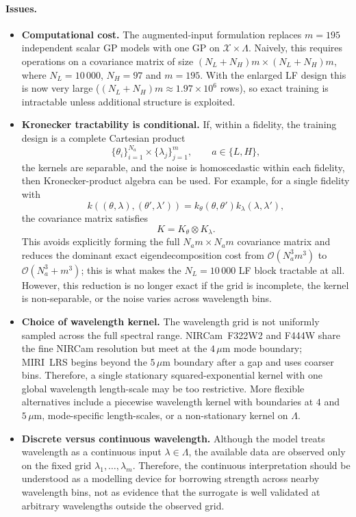 \documentclass[11pt,a4paper]{article}
\begin{document}
\paragraph{Issues.}
\begin{itemize}
    \item \textbf{Computational cost.}
    The augmented-input formulation replaces \(m=195\) independent scalar
    GP models with one GP on \(\mathcal X\times\Lambda\). Naively, this
    requires operations on a covariance matrix of size
    \((N_L+N_H)m\times(N_L+N_H)m\), where \(N_L=10\,000\), \(N_H=97\) and
    \(m=195\). With the enlarged LF design this is now very large
    (\((N_L+N_H)m\approx 1.97\times10^{6}\) rows), so exact training is
    intractable unless additional structure is exploited.

    \item \textbf{Kronecker tractability is conditional.}
    If, within a fidelity, the training design is a complete Cartesian product
    \[
        \{\theta_i\}_{i=1}^{N_a} \times \{\lambda_j\}_{j=1}^m,
        \qquad a\in\{L,H\},
    \]
    the kernels are separable, and the noise is homoscedastic within each
    fidelity, then Kronecker-product algebra can be used. For example, for
    a single fidelity with
    \[
        k((\theta,\lambda),(\theta',\lambda'))
        =
        k_\theta(\theta,\theta')k_\lambda(\lambda,\lambda'),
    \]
    the covariance matrix satisfies
    \[
        K = K_\theta \otimes K_\lambda.
    \]
    This avoids explicitly forming the full \(N_a m\times N_a m\) covariance
    matrix and reduces the dominant exact eigendecomposition cost from
    \(\mathcal O(N_a^3m^3)\) to \(\mathcal O(N_a^3+m^3)\); this is what makes
    the \(N_L=10\,000\) LF block tractable at all. However, this
    reduction is no longer exact if the grid is incomplete, the kernel is
    non-separable, or the noise varies across wavelength bins.

    \item \textbf{Choice of wavelength kernel.}
    The wavelength grid is not uniformly sampled across the full spectral
    range. NIRCam~F322W2 and F444W share the fine NIRCam resolution but meet
    at the $4\,\mu$m mode boundary; MIRI~LRS begins beyond the $5\,\mu$m
    boundary after a gap and uses coarser bins. Therefore, a single stationary
    squared-exponential kernel with one global wavelength length-scale may be
    too restrictive. More flexible alternatives include a piecewise wavelength
    kernel with boundaries at $4$ and $5\,\mu$m, mode-specific length-scales,
    or a non-stationary kernel on \(\Lambda\).

    \item \textbf{Discrete versus continuous wavelength.}
    Although the model treats wavelength as a continuous input
    \(\lambda\in\Lambda\), the available data are observed only on the fixed
    grid \(\lambda_1,\ldots,\lambda_m\). Therefore, the continuous
    interpretation should be understood as a modelling device for borrowing
    strength across nearby wavelength bins, not as evidence that the
    surrogate is well validated at arbitrary wavelengths outside the
    observed grid.
\end{itemize}
\end{document}
